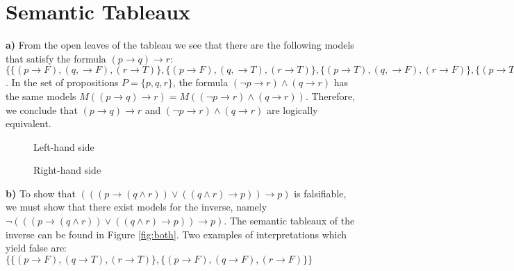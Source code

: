 \documentclass[]{article}
\begin{document}
\section{Semantic Tableaux}
\textbf{a)} From the open leaves of the tableau we see that there are the following models that satisfy the formula $(p\rightarrow q) \rightarrow r$: $\{
\{(p\rightarrow F), (q, \rightarrow F), (r\rightarrow T)\},
\{(p\rightarrow F), (q, \rightarrow T), (r\rightarrow T)\},
\{(p\rightarrow T), (q, \rightarrow F), (r\rightarrow F)\},
\{(p\rightarrow T), (q, \rightarrow F), (r\rightarrow T)\},
\{(p\rightarrow T), (q, \rightarrow T), (r\rightarrow T)\}
\}$. In the set of propositions $P = \{p, q, r\}$, the
formula $(\neg p \rightarrow r) \wedge (q \rightarrow r)$ has the same models $M((p\rightarrow q) \rightarrow r) = M((\neg p \rightarrow r) \wedge (q \rightarrow r))$. Therefore, we conclude that $(p\rightarrow q) \rightarrow r$ and $(\neg p \rightarrow r) \wedge (q \rightarrow r)$ are logically equivalent.

\begin{figure}[h]
\centering
{}
\caption{Left-hand side} \label{fig:LHS}
\end{figure}

\begin{figure}[h]
\centering
{}
\caption{Right-hand side} \label{fig:RHS}
\end{figure}

\noindent \textbf{b)} To show that $(((p \rightarrow (q \wedge r)) \lor ((q \wedge r) \rightarrow p))\rightarrow p)$ is falsifiable, we must show that there exist models for the inverse, namely $\neg (((p \rightarrow (q \wedge r)) \lor ((q \wedge r) \rightarrow p))\rightarrow p)$. The semantic tableaux of the inverse can be found in Figure \ref{fig:both}. Two examples of interpretations which yield false are: $\{\{(p\rightarrow F), (q\rightarrow T), (r\rightarrow T)\},\{(p\rightarrow F),(q\rightarrow F),(r\rightarrow F)\}\}$
\end{document}
